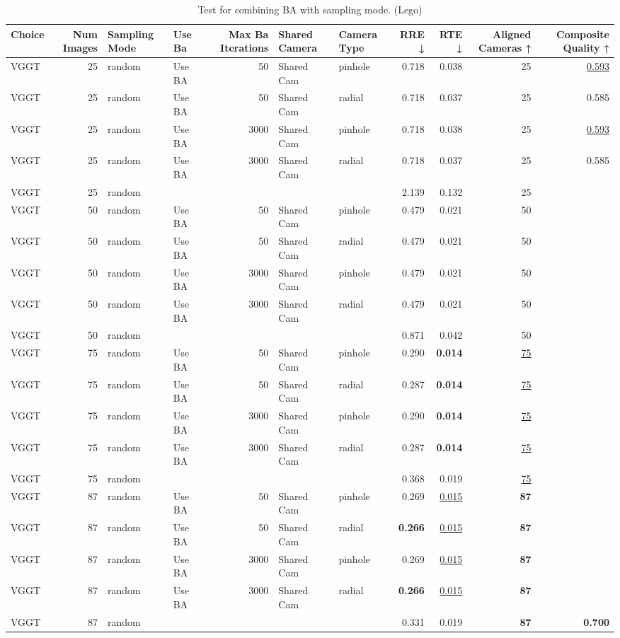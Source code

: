 \begin{table}[H]
\caption{Test for combining BA with sampling mode. (Lego)}
\label{tab:99_ba_sampling_mode_lego}
\begin{tabular}{lrllrllrrrr}
\toprule
Choice & Num Images & Sampling Mode & Use Ba & Max Ba Iterations & Shared Camera & Camera Type & RRE ↓ & RTE ↓ & Aligned Cameras ↑ & Composite Quality ↑ \\
\midrule
VGGT & 25 & random & Use BA & 50 & Shared Cam & pinhole & 0.718 & 0.038 & 25 & \underline{0.593} \\
VGGT & 25 & random & Use BA & 50 & Shared Cam & radial & 0.718 & 0.037 & 25 & 0.585 \\
VGGT & 25 & random & Use BA & 3000 & Shared Cam & pinhole & 0.718 & 0.038 & 25 & \underline{0.593} \\
VGGT & 25 & random & Use BA & 3000 & Shared Cam & radial & 0.718 & 0.037 & 25 & 0.585 \\
VGGT & 25 & random &  &  &  &  & 2.139 & 0.132 & 25 &  \\
VGGT & 50 & random & Use BA & 50 & Shared Cam & pinhole & 0.479 & 0.021 & 50 &  \\
VGGT & 50 & random & Use BA & 50 & Shared Cam & radial & 0.479 & 0.021 & 50 &  \\
VGGT & 50 & random & Use BA & 3000 & Shared Cam & pinhole & 0.479 & 0.021 & 50 &  \\
VGGT & 50 & random & Use BA & 3000 & Shared Cam & radial & 0.479 & 0.021 & 50 &  \\
VGGT & 50 & random &  &  &  &  & 0.871 & 0.042 & 50 &  \\
VGGT & 75 & random & Use BA & 50 & Shared Cam & pinhole & 0.290 & \textbf{0.014} & \underline{75} &  \\
VGGT & 75 & random & Use BA & 50 & Shared Cam & radial & 0.287 & \textbf{0.014} & \underline{75} &  \\
VGGT & 75 & random & Use BA & 3000 & Shared Cam & pinhole & 0.290 & \textbf{0.014} & \underline{75} &  \\
VGGT & 75 & random & Use BA & 3000 & Shared Cam & radial & 0.287 & \textbf{0.014} & \underline{75} &  \\
VGGT & 75 & random &  &  &  &  & 0.368 & 0.019 & \underline{75} &  \\
VGGT & 87 & random & Use BA & 50 & Shared Cam & pinhole & 0.269 & \underline{0.015} & \textbf{87} &  \\
VGGT & 87 & random & Use BA & 50 & Shared Cam & radial & \textbf{0.266} & \underline{0.015} & \textbf{87} &  \\
VGGT & 87 & random & Use BA & 3000 & Shared Cam & pinhole & 0.269 & \underline{0.015} & \textbf{87} &  \\
VGGT & 87 & random & Use BA & 3000 & Shared Cam & radial & \textbf{0.266} & \underline{0.015} & \textbf{87} &  \\
VGGT & 87 & random &  &  &  &  & 0.331 & 0.019 & \textbf{87} & \textbf{0.700} \\
\bottomrule
\end{tabular}
\end{table}
